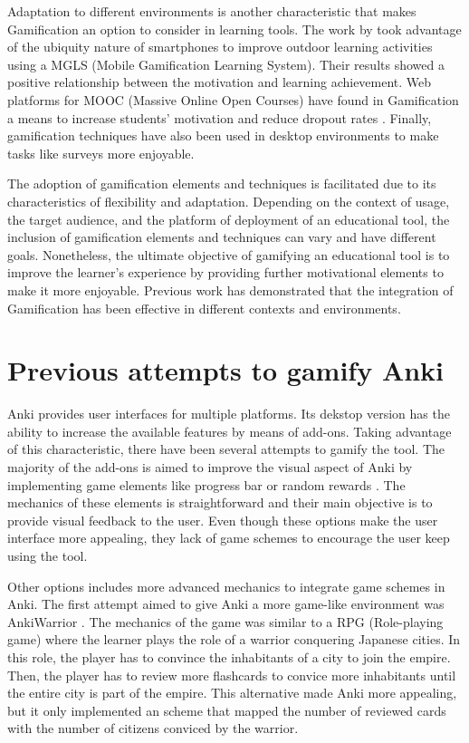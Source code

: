 Adaptation to different environments is another characteristic that makes Gamification an option to consider in learning tools. The work by \citep{su2015mobile} took advantage of the ubiquity nature of smartphones to improve outdoor learning activities using a MGLS (Mobile Gamification Learning System). Their results showed a positive relationship between the motivation and learning achievement. Web platforms for MOOC (Massive Online Open Courses) have found in Gamification a means to increase students' motivation and reduce dropout rates \citep{gene2014gamification}. Finally, gamification techniques have also been used in desktop environments to make tasks like surveys more enjoyable\citep{cheong2013quick}.

The adoption of gamification elements and techniques is facilitated due to its characteristics of flexibility and adaptation. Depending on the context of usage, the target audience, and the platform of deployment of an educational tool, the inclusion of gamification elements and techniques can vary and have different goals. Nonetheless, the ultimate objective of gamifying an educational tool is to improve the learner's experience by providing further motivational elements to make it more enjoyable. Previous work has demonstrated that the integration of Gamification has been effective in different contexts and environments.

\section{Previous attempts to gamify Anki}
Anki provides user interfaces for multiple platforms. Its dekstop version has the ability to increase the available features by means of add-ons. Taking advantage of this characteristic, there have been several attempts to gamify the tool. The majority of the add-ons is aimed to improve the visual aspect of Anki by implementing game elements like progress bar \citep{glut2017progress} or random rewards \citep{glut2017puppy}. The mechanics of these elements is straightforward and their main objective is to provide visual feedback to the user. Even though these options make the user interface more appealing, they lack of game schemes to encourage the user keep using the tool.

Other options includes more advanced mechanics to integrate game schemes in Anki. The first attempt aimed to give Anki a more game-like environment was AnkiWarrior \citep{proxx2010warrior}. The mechanics of the game was similar to a RPG (Role-playing game) where the learner plays the role of a warrior conquering Japanese cities. In this role, the player has to convince the inhabitants of a city to join the empire. Then, the player has to review more flashcards to convice more inhabitants until the entire city is part of the empire. This alternative made Anki more appealing, but it only implemented an scheme that mapped the number of reviewed cards with the number of citizens conviced by the warrior.

